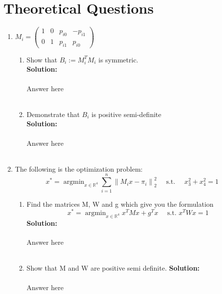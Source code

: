 \documentclass[letta4 paper]{article}
\numberwithin{equation}{section}
\newcommand{\0}{\mathbf{0}}
\begin{document}
	 \section{Theoretical Questions}
	 \begin{enumerate}
	 	\item $M_{i}=\left(\begin{array}{cccc}{1} & {0} & {p_{i 0}} & {-p_{i 1}} \\ {0} & {1} & {p_{i 1}} & {p_{i 0}}\end{array}\right)$
 		\begin{enumerate}
 		\item Show that $B_{i} :=M_{i}^{T} M_{i}$ is symmetric. \\
 		\textbf{Solution:}
 		\\
 		\\
 		Answer here
  		\\
 		\\		
 		
 		
 		\item Demonstrate that $B_{i}$ is positive semi-definite\\
 		\textbf{Solution:}
 		\\
 		\\
 		Answer here
 		\\
 		\\		
 		
	 	\end{enumerate}
 		
 		\item The following is the optimization problem:
 		\[ 
 		x^{*}=\operatorname{argmin}_{x \in \mathbb{R}^{4}} \sum_{i=1}^{n}\left\|M_{i} x-\pi_{i}\right\|_{2}^{2} \quad \text { s.t. } \quad x_{3}^{2}+x_{4}^{2}=1
 		\] 
 		\begin{enumerate}
		\item Find the matrices M, W and g which give you the formulation 
		\[
		 x^{*}=\operatorname{argmin}_{x \in \mathbb{R}^{4}} x^{T} M x+g^{T} x 
		\quad \text { s.t. } x^{T} W x=1
		\]
 		\textbf{Solution:}
		\\
		\\
		Answer here
		\\
		\\		
		
		\item Show that M and W are positive semi definite.
 		\textbf{Solution:}
		\\
		\\
		Answer here
		\\
		\\		
		
 		\end{enumerate}
	 	
	 \end{enumerate}


			
\end{document}
